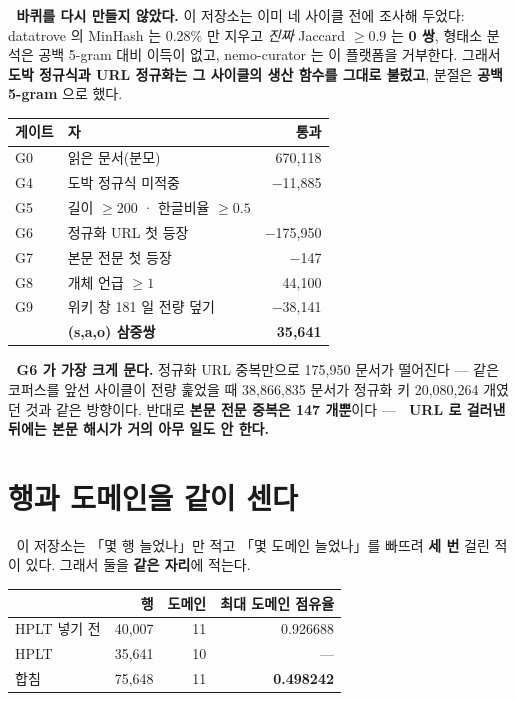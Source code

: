 \documentclass[10pt]{article}
\begin{document}
🔴 \textbf{바퀴를 다시 만들지 않았다.} 이 저장소는 이미 네 사이클 전에 조사해 두었다:
datatrove 의 MinHash 는 0.28\% 만 지우고 \emph{진짜} Jaccard $\ge 0.9$ 는 \textbf{0 쌍},
형태소 분석은 공백 5-gram 대비 이득이 없고, nemo-curator 는 이 플랫폼을 거부한다.
그래서 \textbf{도박 정규식과 URL 정규화는 그 사이클의 생산 함수를 그대로 불렀고},
분절은 \textbf{공백 5-gram} 으로 했다.

\begin{center}\tsize
\begin{tabular}{llr}
\toprule
게이트 & 자 & 통과 \\
\midrule
G0 & 읽은 문서(분모) & 670,118 \\
G4 & 도박 정규식 미적중 & $-$11,885 \\
G5 & 길이 $\ge 200$ · 한글비율 $\ge 0.5$ & \\
G6 & 정규화 URL 첫 등장 & $-$175,950 \\
G7 & 본문 전문 첫 등장 & $-$147 \\
G8 & 개체 언급 $\ge 1$ & 44,100 \\
G9 & 위키 창 181 일 전량 덮기 & $-$38,141 \\
\midrule
& \textbf{(s,a,o) 삼중쌍} & \textbf{35,641} \\
\bottomrule
\end{tabular}
\end{center}

🔴 \textbf{G6 가 가장 크게 문다.} 정규화 URL 중복만으로 175,950 문서가 떨어진다 ---
같은 코퍼스를 앞선 사이클이 전량 훑었을 때 38{,}866{,}835 문서가 정규화 키 20{,}080{,}264 개였던
것과 같은 방향이다. 반대로 \textbf{본문 전문 중복은 147 개뿐}이다 ---
🔴 \textbf{URL 로 걸러낸 뒤에는 본문 해시가 거의 아무 일도 안 한다.}


\section{행과 도메인을 같이 센다}

🔴 이 저장소는 「몇 행 늘었나」만 적고 「몇 도메인 늘었나」를 빠뜨려 \textbf{세 번} 걸린 적이 있다.
그래서 둘을 \textbf{같은 자리}에 적는다.

\begin{center}\tsize
\begin{tabular}{lrrr}
\toprule
 & 행 & 도메인 & 최대 도메인 점유율 \\
\midrule
HPLT 넣기 전 & 40,007 & 11 & 0.926688 \\
HPLT & 35,641 & 10 & --- \\
\midrule
합침 & 75,648 & 11 & \textbf{0.498242} \\
\bottomrule
\end{tabular}
\end{center}
\end{document}
